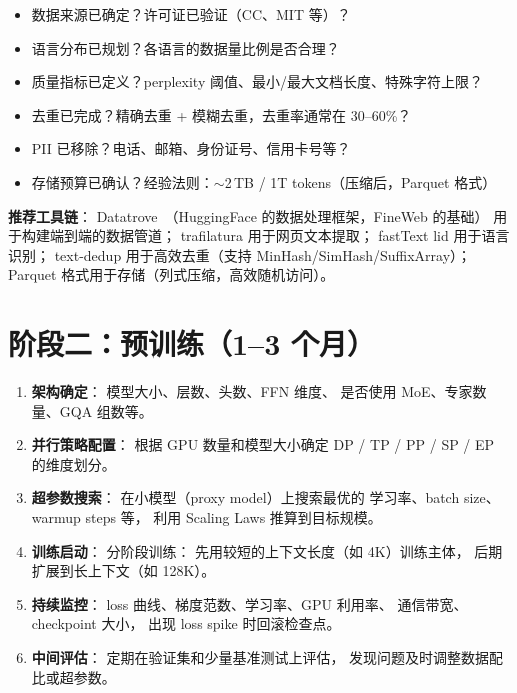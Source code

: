 \begin{keybox}
\begin{itemize}[noitemsep]
  \item[\textbullet] 数据来源已确定？许可证已验证（CC、MIT 等）？
  \item[\textbullet] 语言分布已规划？各语言的数据量比例是否合理？
  \item[\textbullet] 质量指标已定义？perplexity 阈值、最小/最大文档长度、特殊字符上限？
  \item[\textbullet] 去重已完成？精确去重 + 模糊去重，去重率通常在 30--60\%？
  \item[\textbullet] PII 已移除？电话、邮箱、身份证号、信用卡号等？
  \item[\textbullet] 存储预算已确认？经验法则：$\sim$2\,TB / 1T tokens（压缩后，Parquet 格式）
\end{itemize}
\end{keybox}

\textbf{推荐工具链}：
Datatrove~\cite{penedo2024fineweb}（HuggingFace 的数据处理框架，FineWeb 的基础）
用于构建端到端的数据管道；
trafilatura 用于网页文本提取；
fastText lid 用于语言识别；
text-dedup 用于高效去重（支持 MinHash/SimHash/SuffixArray）；
Parquet 格式用于存储（列式压缩，高效随机访问）。

\section{阶段二：预训练（1--3 个月）}

\begin{enumerate}[noitemsep]
  \item \textbf{架构确定}：
        模型大小、层数、头数、FFN 维度、
        是否使用 MoE、专家数量、GQA 组数等。
  \item \textbf{并行策略配置}：
        根据 GPU 数量和模型大小确定
        DP / TP / PP / SP / EP 的维度划分。
  \item \textbf{超参数搜索}：
        在小模型（proxy model）上搜索最优的
        学习率、batch size、warmup steps 等，
        利用 Scaling Laws 推算到目标规模。
  \item \textbf{训练启动}：
        分阶段训练：
        先用较短的上下文长度（如 4K）训练主体，
        后期扩展到长上下文（如 128K）。
  \item \textbf{持续监控}：
        loss 曲线、梯度范数、学习率、GPU 利用率、
        通信带宽、checkpoint 大小，
        出现 loss spike 时回滚检查点。
  \item \textbf{中间评估}：
        定期在验证集和少量基准测试上评估，
        发现问题及时调整数据配比或超参数。
\end{enumerate}

